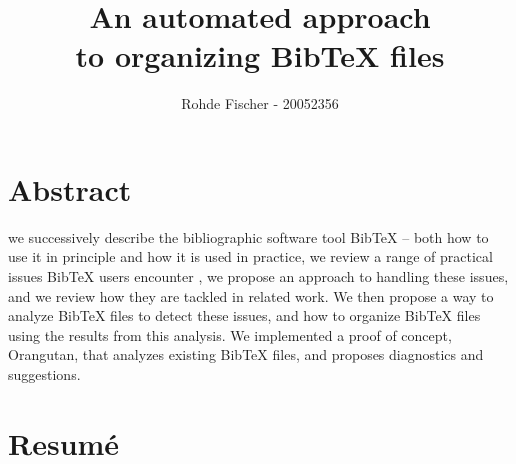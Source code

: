 \documentclass[twoside,11pt,openright,a4paper]{report}
\newcommand{\orangutan}{Orangutan}
\newcommand{\bibtex}{Bib{\TeX}}
\begin{document}
\pagestyle{empty}
\begin{titlepage}
\author{Rohde Fischer - 20052356}
\title{An automated approach\\to organizing {\bibtex} files}
{\maketitle}

\end{titlepage}


\pagestyle{plain}
\setcounter{page}{1}



\chapter*{Abstract}

we successively describe the bibliographic software tool {\bibtex} --
both how to use it in principle and how it is used in practice, we
review a range of practical issues {\bibtex} users encounter , we
propose an approach to handling these issues, and we review how they
are tackled in related work.  We then propose a way to analyze
{\bibtex} files to detect these issues, and how to organize {\bibtex}
files using the results from this analysis.  We implemented a proof of
concept, {\orangutan}, that analyzes existing {\bibtex} files, and
proposes diagnostics and suggestions.


\chapter*{Resumé}

%

{\tableofcontents}

\setcounter{secnumdepth}{2}
\end{document}
